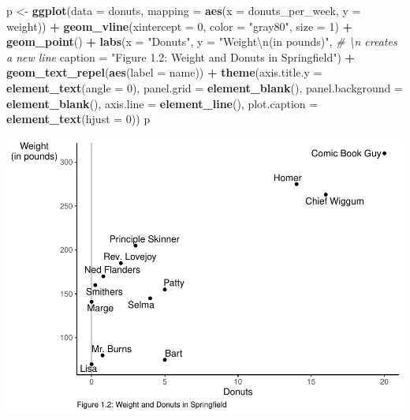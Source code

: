 \documentclass[]{book}
\newenvironment{Shaded}{\begin{snugshade}}{\end{snugshade}}
\newcommand{\CharTok}[1]{\textcolor[rgb]{0.31,0.60,0.02}{#1}}
\newcommand{\CommentTok}[1]{\textcolor[rgb]{0.56,0.35,0.01}{\textit{#1}}}
\newcommand{\DataTypeTok}[1]{\textcolor[rgb]{0.13,0.29,0.53}{#1}}
\newcommand{\DecValTok}[1]{\textcolor[rgb]{0.00,0.00,0.81}{#1}}
\newcommand{\KeywordTok}[1]{\textcolor[rgb]{0.13,0.29,0.53}{\textbf{#1}}}
\newcommand{\NormalTok}[1]{#1}
\newcommand{\OperatorTok}[1]{\textcolor[rgb]{0.81,0.36,0.00}{\textbf{#1}}}
\newcommand{\StringTok}[1]{\textcolor[rgb]{0.31,0.60,0.02}{#1}}
\begin{document}
\begin{Shaded}
\begin{Highlighting}[]
\NormalTok{p <-}\StringTok{ }\KeywordTok{ggplot}\NormalTok{(}\DataTypeTok{data =}\NormalTok{ donuts, }
       \DataTypeTok{mapping =} \KeywordTok{aes}\NormalTok{(}\DataTypeTok{x =}\NormalTok{ donuts_per_week, }\DataTypeTok{y =}\NormalTok{ weight)) }\OperatorTok{+}\StringTok{ }
\StringTok{  }\KeywordTok{geom_vline}\NormalTok{(}\DataTypeTok{xintercept =} \DecValTok{0}\NormalTok{, }\DataTypeTok{color =} \StringTok{"gray80"}\NormalTok{, }\DataTypeTok{size =} \DecValTok{1}\NormalTok{) }\OperatorTok{+}
\StringTok{  }\KeywordTok{geom_point}\NormalTok{() }\OperatorTok{+}\StringTok{ }
\StringTok{  }\KeywordTok{labs}\NormalTok{(}\DataTypeTok{x =} \StringTok{"Donuts"}\NormalTok{, }
       \DataTypeTok{y =} \StringTok{"Weight}\CharTok{\textbackslash{}n}\StringTok{(in pounds)"}\NormalTok{, }\CommentTok{# \textbackslash{}n creates a new line}
       \DataTypeTok{caption =} \StringTok{"Figure 1.2: Weight and Donuts in Springfield"}\NormalTok{) }\OperatorTok{+}\StringTok{ }
\StringTok{  }\KeywordTok{geom_text_repel}\NormalTok{(}\KeywordTok{aes}\NormalTok{(}\DataTypeTok{label =}\NormalTok{ name)) }\OperatorTok{+}
\StringTok{  }\KeywordTok{theme}\NormalTok{(}\DataTypeTok{axis.title.y =} \KeywordTok{element_text}\NormalTok{(}\DataTypeTok{angle =} \DecValTok{0}\NormalTok{), }
          \DataTypeTok{panel.grid =} \KeywordTok{element_blank}\NormalTok{(), }
          \DataTypeTok{panel.background =} \KeywordTok{element_blank}\NormalTok{(), }
          \DataTypeTok{axis.line =} \KeywordTok{element_line}\NormalTok{(), }
          \DataTypeTok{plot.caption =} \KeywordTok{element_text}\NormalTok{(}\DataTypeTok{hjust =} \DecValTok{0}\NormalTok{)) }
\NormalTok{p }
\end{Highlighting}
\end{Shaded}

\includegraphics{bailey_files/figure-latex/figure1.2 again-1.pdf}
\end{document}
